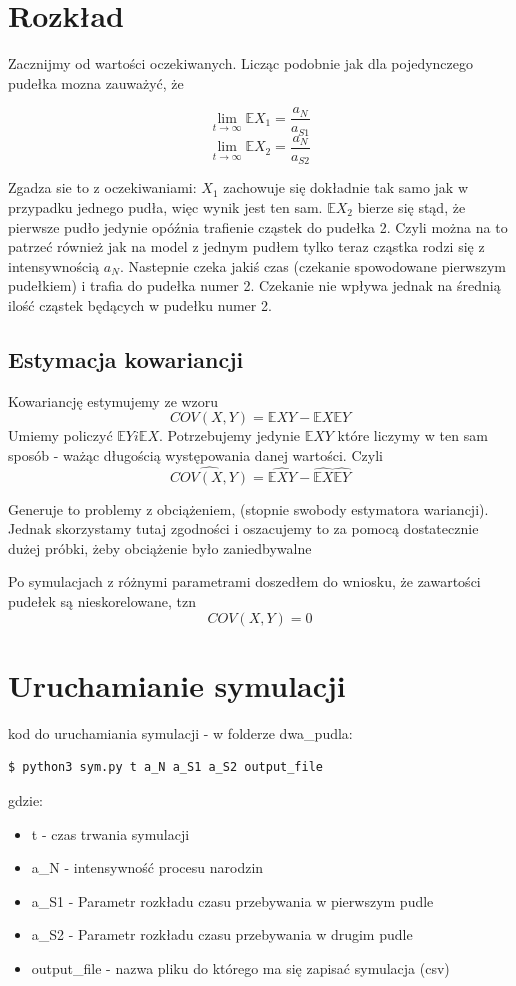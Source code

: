 \documentclass{article}
\begin{document}
\section{Rozkład}

Zacznijmy od wartości oczekiwanych. Licząc podobnie jak dla pojedynczego pudełka mozna zauważyć, że 

\[\lim_{t\rightarrow \infty}\mathbb{E}X_1 = \frac{a_N}{a_{S1}} \]
\[\lim_{t\rightarrow \infty}\mathbb{E}X_2 = \frac{a_N}{a_{S2}} \]

Zgadza sie to z oczekiwaniami:
$X_1$ zachowuje się dokładnie tak samo jak w przypadku jednego pudła, więc wynik jest ten sam. $\mathbb{E}X_2$ bierze się stąd, że pierwsze pudło jedynie opóźnia trafienie cząstek do pudełka 2. Czyli można na to patrzeć również jak na model z jednym pudłem tylko teraz cząstka rodzi się z intensywnością $a_N$. Nastepnie czeka jakiś czas (czekanie spowodowane pierwszym pudełkiem) i trafia do pudełka numer 2. Czekanie nie wpływa jednak na średnią ilość cząstek będących w pudełku numer 2.

\subsection{Estymacja kowariancji}

Kowariancję estymujemy ze wzoru \[COV(X,Y) = \mathbb{E}XY - \mathbb{E}X \mathbb{E}Y \] Umiemy policzyć $\mathbb{E}Y i \mathbb{E}X$. Potrzebujemy jedynie $\mathbb{E}XY$ które liczymy w ten sam sposób - ważąc długością występowania danej wartości. Czyli \[\hat{COV(X,Y)} = \hat{\mathbb{E}XY} - \hat{\mathbb{E}X} \hat{\mathbb{E}Y}\]

Generuje to problemy z obciążeniem, (stopnie swobody estymatora wariancji). Jednak skorzystamy tutaj zgodności i oszacujemy to za pomocą dostatecznie dużej próbki, żeby obciążenie było zaniedbywalne

Po symulacjach z różnymi parametrami doszedłem do wniosku, że zawartości pudełek są nieskorelowane, tzn \[COV(X,Y) = 0\]


\section{Uruchamianie symulacji}
\noindent kod do uruchamiania symulacji - w folderze dwa\_pudla:
\begin{lstlisting}[language=bash]
  $ python3 sym.py t a_N a_S1 a_S2 output_file 
\end{lstlisting}
gdzie: \begin{itemize}
\item t - czas trwania symulacji
\item a\_N - intensywność procesu narodzin
\item a\_S1 - Parametr rozkładu czasu przebywania w pierwszym pudle
\item a\_S2 - Parametr rozkładu czasu przebywania w drugim pudle
\item output\_file - nazwa pliku do którego ma się zapisać symulacja (csv)
\end{itemize}
\end{document}
